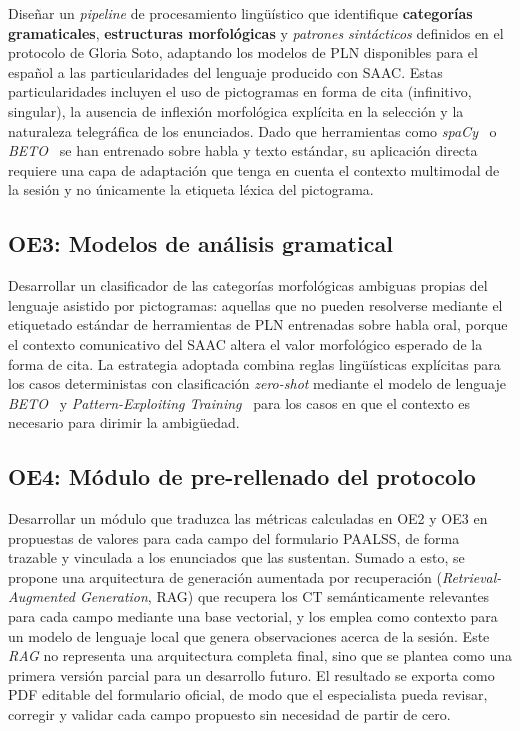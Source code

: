 Diseñar un \emph{pipeline} de procesamiento lingüístico que identifique \textbf{categorías
gramaticales}, \textbf{estructuras morfológicas} y \emph{patrones sintácticos} definidos en el 
protocolo de Gloria Soto, adaptando los modelos de \ac{PLN} disponibles para el español a las
particularidades del lenguaje producido con \ac{SAAC}. Estas particularidades incluyen el uso
de pictogramas en forma de cita (infinitivo, singular), la ausencia de inflexión
morfológica explícita en la selección y la naturaleza telegráfica de los enunciados. Dado
que herramientas como \emph{spaCy}~\cite{spoken_spanish_pos} o
\emph{BETO}~\cite{beto_morphological} se han entrenado sobre habla y texto estándar,
su aplicación directa requiere una capa de adaptación que tenga en cuenta el contexto
multimodal de la sesión y no únicamente la etiqueta léxica del pictograma.

\subsection{OE3: Modelos de análisis gramatical}

Desarrollar un clasificador de las categorías morfológicas ambiguas propias del
lenguaje asistido por pictogramas: aquellas que no pueden resolverse mediante el
etiquetado estándar de herramientas de \ac{PLN} entrenadas sobre habla oral, porque
el contexto comunicativo del \ac{SAAC} altera el valor morfológico esperado de la
forma de cita. La estrategia adoptada combina reglas lingüísticas explícitas para
los casos deterministas con clasificación \emph{zero-shot} mediante el modelo de
lenguaje \emph{BETO}~\cite{beto_morphological} y \emph{Pattern-Exploiting
Training}~\cite{fewshot_clinical_nlp} para los casos en que el contexto es
necesario para dirimir la ambigüedad.

\subsection{OE4: Módulo de pre-rellenado del protocolo}

Desarrollar un módulo que traduzca las métricas calculadas en OE2 y OE3 en propuestas
de valores para cada campo del formulario \ac{PAALSS}, de forma trazable y vinculada
a los enunciados que las sustentan. Sumado a esto, se propone una arquitectura de generación
aumentada por recuperación (\emph{Retrieval-Augmented Generation}, \ac{RAG})
\cite{rag_lewis2020} que recupera los \ac{CT} semánticamente relevantes para cada
campo mediante una base vectorial, y los emplea como contexto para un modelo de
lenguaje local que genera observaciones acerca de la sesión. Este \emph{RAG} no representa una 
arquitectura completa final, sino que se plantea como una primera versión parcial para un desarrollo
futuro. El resultado se exporta como \ac{PDF} editable del formulario oficial, de modo que el especialista pueda revisar,
corregir y validar cada campo propuesto sin necesidad de partir de cero.

